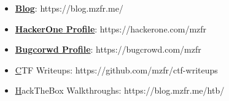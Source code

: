 
\begin{itemize}
    \item {\href{https://blog.mzfr.me/}\textbf{Blog}: } https://blog.mzfr.me/
    
    \item {\href{https://hackerone.com/mzfr}\textbf{HackerOne Profile}: } https://hackerone.com/mzfr

    \item {\href{https://bugcrowd.com/mzfr}\textbf{Bugcorwd Profile}: } https://bugcrowd.com/mzfr
    
    \item {\href{https://github.com/mzfr/ctf-writeups}CTF Writeups: } https://github.com/mzfr/ctf-writeups

    \item {\href{https://blog.mzfr.me/htb/}HackTheBox Walkthroughs: } https://blog.mzfr.me/htb/

\end{itemize}
